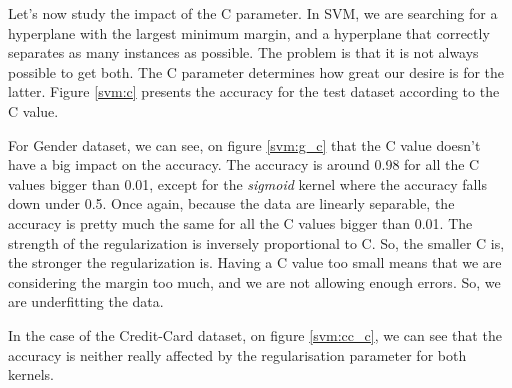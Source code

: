 \documentclass[10pt]{article}
\begin{document}
			Let's now study the impact of the C parameter. In SVM, we are searching for a hyperplane with the largest minimum margin, and a hyperplane that correctly separates as many instances as possible. The problem is that it is not always possible to get both. The C parameter determines how great our desire is for the latter. Figure \ref{svm:c} presents the accuracy for the test dataset according to the C value.

			For Gender dataset, we can see, on figure \ref{svm:g_c} that the C value doesn't have a big impact on the accuracy. The accuracy is around 0.98 for all the C values bigger than 0.01, except for the \textit{sigmoid} kernel where the accuracy falls down under 0.5. Once again, because the data are linearly separable, the accuracy is pretty much the same for all the C values bigger than 0.01.
			The strength of the regularization is inversely proportional to C. So, the smaller C is, the stronger the regularization is. Having a C value too small means that we are considering the margin too much, and we are not allowing enough errors. So, we are underfitting the data.

			In the case of the Credit-Card dataset, on figure \ref{svm:cc_c}, we can see that the accuracy is neither really affected by the regularisation parameter for both kernels.
\end{document}
